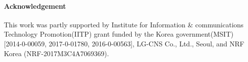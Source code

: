 \documentclass[letterpaper]{article} %
\begin{document}
\paragraph{Acknowledgement}
This work was partly supported by Institute for Information \& communications Technology Promotion(IITP) grant funded by the Korea government(MSIT)[2014-0-00059, 2017-0-01780, 2016-0-00563], LG-CNS Co., Ltd., Seoul, and NRF Korea (NRF-2017M3C4A7069369). 







{
\small


}
\end{document}
